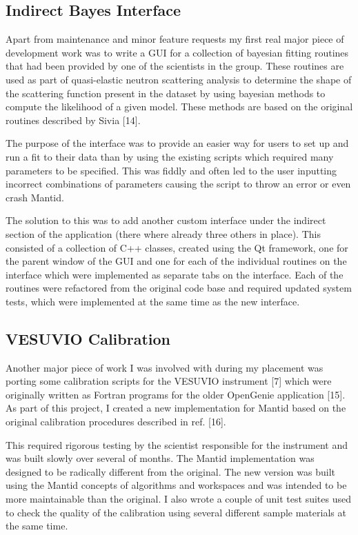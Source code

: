 \documentclass[paper=a4, fontsize=11pt]{scrartcl}	%
\numberwithin{equation}{section}															%
\numberwithin{figure}{section}																%
\numberwithin{table}{section}
\begin{document}
\subsection{Indirect Bayes Interface}\label{indirect-bayes-interface}

Apart from maintenance and minor feature requests my first real major
piece of development work was to write a GUI for a collection of
bayesian fitting routines that had been provided by one of the
scientists in the group. These routines are used as part of
quasi-elastic neutron scattering analysis to determine the shape of the
scattering function present in the dataset by using bayesian methods to
compute the likelihood of a given model. These methods are based on the
original routines described by Sivia {[}14{]}.

The purpose of the interface was to provide an easier way for users to
set up and run a fit to their data than by using the existing scripts
which required many parameters to be specified. This was fiddly and
often led to the user inputting incorrect combinations of parameters
causing the script to throw an error or even crash Mantid.

The solution to this was to add another custom interface under the
indirect section of the application (there where already three others in
place). This consisted of a collection of C++ classes, created using the
Qt framework, one for the parent window of the GUI and one for each of
the individual routines on the interface which were implemented as
separate tabs on the interface. Each of the routines were refactored
from the original code base and required updated system tests, which
were implemented at the same time as the new interface.

\subsection{VESUVIO Calibration}\label{vesuvio-calibration}

Another major piece of work I was involved with during my placement was
porting some calibration scripts for the VESUVIO instrument {[}7{]} which were
originally written as Fortran programs for the older OpenGenie
application {[}15{]}. As part of this project, I created a new
implementation for Mantid based on the original calibration procedures
described in ref. {[}16{]}.

This required rigorous testing by the scientist responsible for the
instrument and was built slowly over several of months. The Mantid
implementation was designed to be radically different from the original.
The new version was built using the Mantid concepts of algorithms and
workspaces and was intended to be more maintainable than the original. I
also wrote a couple of unit test suites used to check the quality of the
calibration using several different sample materials at the same time.
\end{document}
